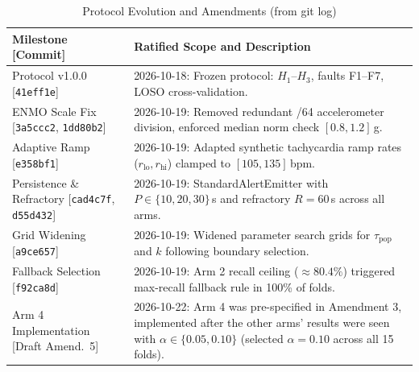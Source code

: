 \begin{table}[htbp]
\caption{Protocol Evolution and Amendments (from git log)}
\label{tab:deviations}
\centering
\scriptsize
\begin{tabular}{|l|p{4.7cm}|}
\hline
\textbf{Milestone [Commit]} & \textbf{Ratified Scope and Description} \\
\hline
Protocol v1.0.0 [\texttt{41eff1e}] & 2026-10-18: Frozen protocol: $H_1$--$H_3$, faults F1--F7, LOSO cross-validation. \\
\hline
ENMO Scale Fix [\texttt{3a5ccc2}, \texttt{1dd80b2}] & 2026-10-19: Removed redundant /64 accelerometer division, enforced median norm check $[0.8, 1.2]$\,g. \\
\hline
Adaptive Ramp [\texttt{e358bf1}] & 2026-10-19: Adapted synthetic tachycardia ramp rates ($r_{\text{lo}}, r_{\text{hi}}$) clamped to $[105, 135]$\,bpm. \\
\hline
Persistence \& Refractory [\texttt{cad4c7f}, \texttt{d55d432}] & 2026-10-19: StandardAlertEmitter with $P \in \{10, 20, 30\}$\,s and refractory $R = 60$\,s across all arms. \\
\hline
Grid Widening [\texttt{a9ce657}] & 2026-10-19: Widened parameter search grids for $\tau_{\text{pop}}$ and $k$ following boundary selection. \\
\hline
Fallback Selection [\texttt{f92ca8d}] & 2026-10-19: Arm 2 recall ceiling ($\approx 80.4\%$) triggered max-recall fallback rule in 100\% of folds. \\
\hline
Arm 4 Implementation [Draft Amend.~5] & 2026-10-22: Arm 4 was pre-specified in Amendment 3, implemented after the other arms' results were seen with $\alpha \in \{0.05, 0.10\}$ (selected $\alpha = 0.10$ across all 15 folds). \\
\hline
\end{tabular}
\end{table}

